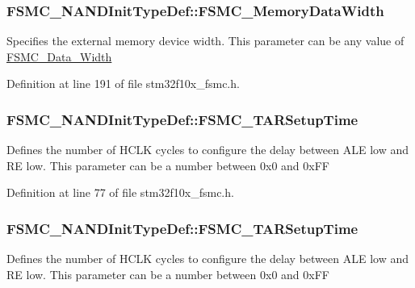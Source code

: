 \subsubsection[{\texorpdfstring{F\+S\+M\+C\+\_\+\+Memory\+Data\+Width}{FSMC_MemoryDataWidth}}]{ F\+S\+M\+C\+\_\+\+N\+A\+N\+D\+Init\+Type\+Def\+::\+F\+S\+M\+C\+\_\+\+Memory\+Data\+Width}\hypertarget{struct_f_s_m_c___n_a_n_d_init_type_def_ab4a4f56aab3150d8fb02aaf092db0235}{}\label{struct_f_s_m_c___n_a_n_d_init_type_def_ab4a4f56aab3150d8fb02aaf092db0235}
Specifies the external memory device width. This parameter can be any value of \hyperlink{group___f_s_m_c___data___width}{F\+S\+M\+C\+\_\+\+Data\+\_\+\+Width} 

Definition at line 191 of file stm32f10x\+\_\+fsmc.\+h.

\subsubsection[{\texorpdfstring{F\+S\+M\+C\+\_\+\+T\+A\+R\+Setup\+Time}{FSMC_TARSetupTime}}]{ F\+S\+M\+C\+\_\+\+N\+A\+N\+D\+Init\+Type\+Def\+::\+F\+S\+M\+C\+\_\+\+T\+A\+R\+Setup\+Time}\hypertarget{struct_f_s_m_c___n_a_n_d_init_type_def_a377f520feb3a9d0335b7284a318d9802}{}\label{struct_f_s_m_c___n_a_n_d_init_type_def_a377f520feb3a9d0335b7284a318d9802}
Defines the number of H\+C\+LK cycles to configure the delay between A\+LE low and RE low. This parameter can be a number between 0x0 and 0x\+FF 

Definition at line 77 of file stm32f10x\+\_\+fsmc.\+h.

\subsubsection[{\texorpdfstring{F\+S\+M\+C\+\_\+\+T\+A\+R\+Setup\+Time}{FSMC_TARSetupTime}}]{ F\+S\+M\+C\+\_\+\+N\+A\+N\+D\+Init\+Type\+Def\+::\+F\+S\+M\+C\+\_\+\+T\+A\+R\+Setup\+Time}\hypertarget{struct_f_s_m_c___n_a_n_d_init_type_def_a014c1b8977b454ac15654d93dbb7dff9}{}\label{struct_f_s_m_c___n_a_n_d_init_type_def_a014c1b8977b454ac15654d93dbb7dff9}
Defines the number of H\+C\+LK cycles to configure the delay between A\+LE low and RE low. This parameter can be a number between 0x0 and 0x\+FF 

